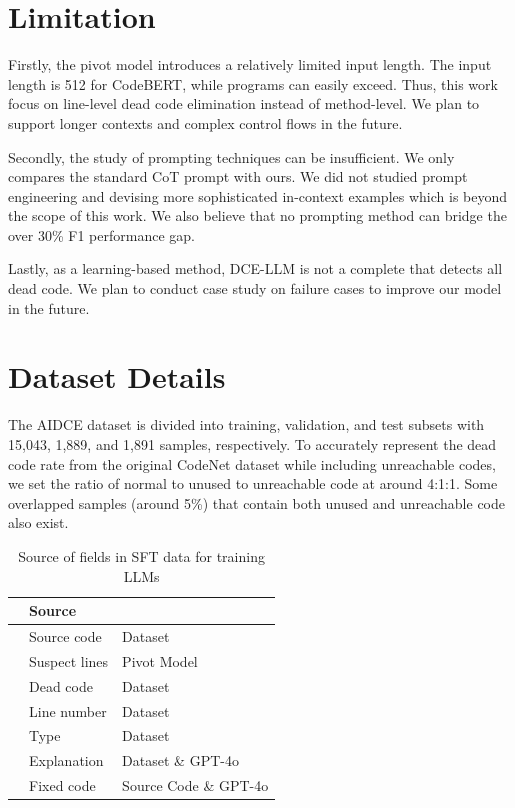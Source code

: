\documentclass[11pt]{article}
\begin{document}
\section*{Limitation}
Firstly, the pivot model introduces a relatively limited input length. The input length is 512 for CodeBERT, while programs can easily exceed. Thus, this work focus on line-level dead code elimination instead of method-level. We plan to support longer contexts and complex control flows in the future.

Secondly, the study of prompting techniques can be insufficient. We only compares the standard CoT prompt with ours. We did not studied prompt engineering and devising more sophisticated in-context examples which is beyond the scope of this work. We also believe that no prompting method can bridge the over 30\% F1 performance gap.

Lastly, as a learning-based method, DCE-LLM is not a complete that detects all dead code. We plan to conduct case study on failure cases to improve our model in the future.




\newpage
\appendix

\section{Dataset Details}
The AIDCE dataset is divided into training, validation, and test subsets with 15,043, 1,889, and 1,891 samples, respectively. To accurately represent the dead code rate from the original CodeNet dataset while including unreachable codes, we set the ratio of normal to unused to unreachable code at around 4:1:1. Some overlapped samples (around 5\%) that contain both unused and unreachable code also exist.

\begin{table}[ht]
    \centering
    \begin{tabular}{>{\centering\arraybackslash}m{0.8cm} >{\centering\arraybackslash}m{2cm} >{\centering\arraybackslash}m{2.8cm}}
        \toprule
        \multicolumn{2}{c}{\textbf{Fields}} & \textbf{Source} \\
        \midrule
        \multirow{2}{*}{Input} & Source code & Dataset \\
                               & Suspect lines & Pivot Model\\
        \cmidrule(lr){1-3}
        \multirow{5}{*}{Output} & Dead code & Dataset \\
                                & Line number & Dataset \\
                                & Type & Dataset \\
                                & Explanation & Dataset \& GPT-4o \\
                                & Fixed code & Source Code \& GPT-4o \\
        \bottomrule
    \end{tabular}
    \caption{Source of fields in SFT data for training LLMs}
    \label{taba1}
\end{table}
\end{document}
